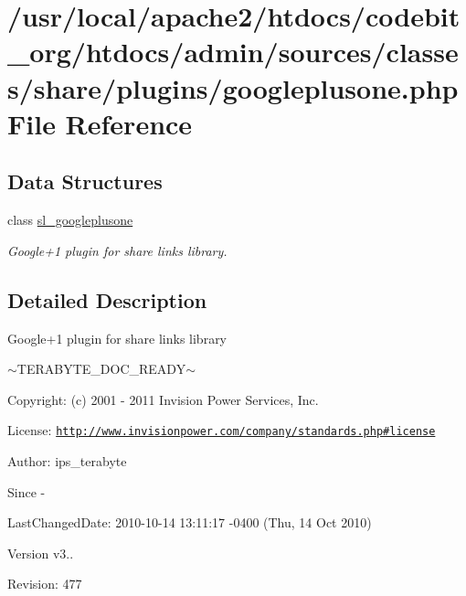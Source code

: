 \hypertarget{googleplusone_8php}{\section{/usr/local/apache2/htdocs/codebit\-\_\-org/htdocs/admin/sources/classes/share/plugins/googleplusone.php File Reference}
\label{googleplusone_8php}
}
\subsection*{Data Structures}
\begin{DoxyCompactItemize}
\item 
class \hyperlink{classsl__googleplusone}{sl\-\_\-googleplusone}
\begin{DoxyCompactList}\small\item\em Google+1 plugin for share links library. \end{DoxyCompactList}\end{DoxyCompactItemize}


\subsection{Detailed Description}
\begin{DoxyVerb}  Google+1 plugin for share links library
\end{DoxyVerb}
 $\sim$\-T\-E\-R\-A\-B\-Y\-T\-E\-\_\-\-D\-O\-C\-\_\-\-R\-E\-A\-D\-Y$\sim$ \begin{DoxyParagraph}{Copyright\-:}
(c) 2001 -\/ 2011 Invision Power Services, Inc.
\end{DoxyParagraph}
\begin{DoxyParagraph}{License\-:}
\href{http://www.invisionpower.com/company/standards.php#license}{\tt http\-://www.\-invisionpower.\-com/company/standards.\-php\#license}
\end{DoxyParagraph}
\begin{DoxyParagraph}{Author\-:}
ips\-\_\-terabyte 
\end{DoxyParagraph}
\begin{DoxySince}{Since}
-\/ 
\end{DoxySince}
\begin{DoxyParagraph}{Last\-Changed\-Date\-:}
2010-\/10-\/14 13\-:11\-:17 -\/0400 (Thu, 14 Oct 2010) 
\end{DoxyParagraph}
\begin{DoxyVersion}{Version}
v3.. 
\end{DoxyVersion}
\begin{DoxyParagraph}{Revision\-:}
477 
\end{DoxyParagraph}
